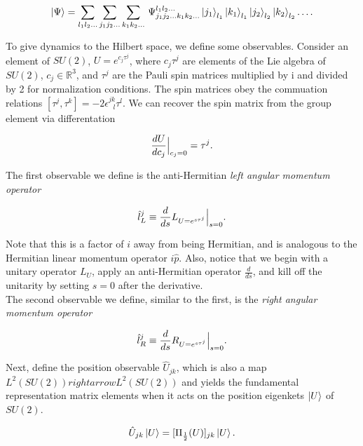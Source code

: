 \begin{equation}
\ket{\Psi} = \sum_{l_1 l_2 \dots} \sum_{j_1 j_2 \dots} \sum_{k_1 k_2 \dots} \, \Psi^{l_1 l_2 \dots}_{j_1 j_2 \dots k_1 k_2 \dots} \ket{j_1}_{l_1} \ket{k_1}_{l_1} \ket{j_2}_{l_2} \ket{k_2}_{l_2} \dots .
\end{equation}

\noindent To give dynamics to the Hilbert space, we define some observables. Consider an element of $SU(2)$, $U=e^{c_j \tau^j}$, where $c_j \tau^j$ are elements of the Lie algebra of $SU(2)$, $c_j \in \mathbb{R}^3$, and $\tau^j$ are the Pauli spin matrices multiplied by i and divided by 2 for normalization conditions. The spin matrices obey the commuation relations $[\tau^j,  \tau^k] = -2 \epsilon^{jk}_{\,\,\,\,l} \tau^l$. We can recover the spin matrix from the group element via differentation

\begin{equation}
\frac{d U}{d c_j} \Big{|}_{c_j = 0} = \tau^j.
\end{equation}

\noindent The first observable we define is the anti-Hermitian \textit{left angular momentum operator}

\begin{equation}
\hat{l}_L^j \equiv \frac{d}{ds} L_{U=e^{s\tau^j}} \Big{|}_{s=0}.
\end{equation}

\noindent Note that this is a factor of $i$ away from being Hermitian, and is analogous to the Hermitian linear momentum operator $i\hat{p}$. Also, notice that we begin with a unitary operator $L_U$, apply an anti-Hermitian operator $\frac{d}{ds}$, and kill off the unitarity by setting $s=0$ after the derivative. \\

\noindent The second observable we define, similar to the first, is the \textit{right angular momentum operator}

\begin{equation}
\hat{l}_R^j \equiv \frac{d}{ds} R_{U=e^{s\tau^j}} \Big{|}_{s=0}.
\end{equation}

\noindent Next, define the position observable $\hat{U}_{jk}$, which is also a map $L^2 (SU(2)) rightarrow L^2 (SU(2))$ and yields the fundamental representation matrix elements when it acts on the position eigenkets $\ket{U}$ of $SU(2)$.

\begin{equation}
\hat{U}_{jk} \ket{U} = [\Pi_{\frac{1}{2}} (U) ]_{jk} \ket{U}.
\end{equation}

